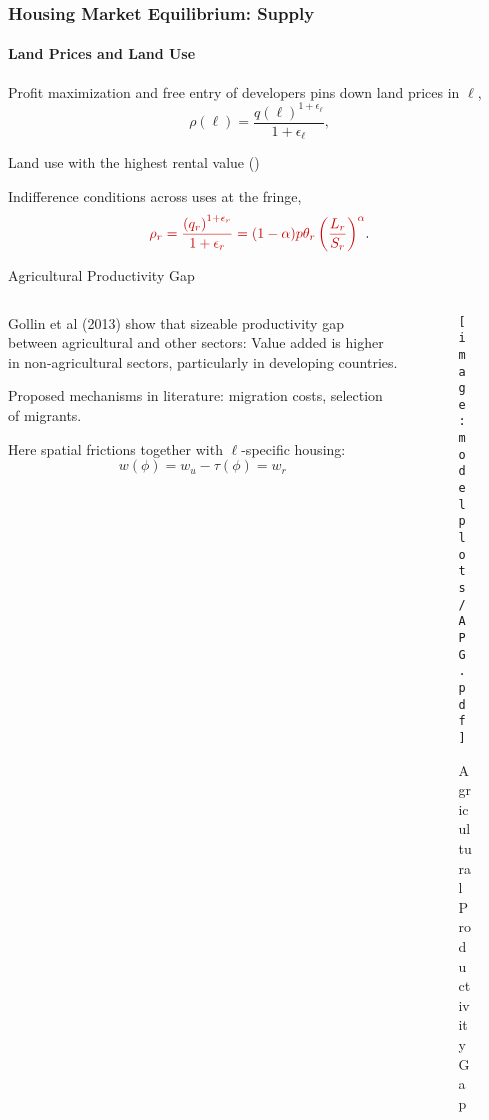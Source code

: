 \documentclass[aspectratio=169]{beamer}
\begin{document}
\begin{frame}
\frametitle{Housing Market Equilibrium: Supply}
\framesubtitle{Land Prices and Land Use}
\bi
\item Profit maximization and free entry of developers pins down land prices in $\ell$,
\begin{equation*}
\rho(\ell)=\frac{q(\ell)^{1+\epsilon_{\ell}}}{ 1+\epsilon_{\ell}},
\end{equation*}
\item Land use with the highest rental value ()
\item Indifference conditions across uses at the fringe,
\begin{equation*}
 \re{\rho_r=\frac{\left( q_r \right)^{1+\epsilon_r}}{1+\epsilon_r} = (1-\alpha)p\theta_r\left(\frac{L_r}{S_r}\right)^{\alpha} }.
\end{equation*}
\hyperlink{eqm}{}
\ei
\end{frame}

\begin{frame}[label=AGP]{Agricultural Productivity Gap}
	\begin{columns}
		\begin{column}{0.5\textwidth}
			\begin{midi}
				\item Gollin et al (2013) show that sizeable productivity gap between agricultural and other sectors: Value added is higher in non-agricultural sectors, particularly in developing countries.
				\item Proposed mechanisms in literature: migration costs, selection of migrants.
				\item Here spatial frictions together with $\ell$-specific housing:
				\begin{equation*}
					w(\phi) = w_u - \tau(\phi) = w_r
				\end{equation*}
			\end{midi}
		\end{column}
		\begin{column}{0.5\textwidth}
			\begin{figure}
				\texttt{[image: \\modelplots/APG.pdf]}
				\caption{Agricultural Productivity Gap}	
			\end{figure}
		\end{column}
	\end{columns}
	\hyperlink{wealthdist}{}

\end{frame}
\end{document}
